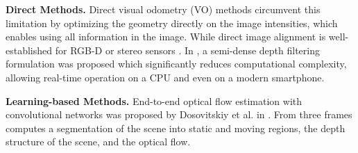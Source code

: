 \documentclass{article}
\begin{document}
\textbf{Direct Methods.} Direct visual odometry (VO) methods circumvent this limitation by optimizing the geometry directly on the image intensities, which enables using all information in the image. While direct image alignment is well-established for RGB-D or stereo sensors \cite{Kerl2014Dense} \cite{Comport2016Accurate}. In \cite{Engel2014LSD}, a semi-dense depth filtering formulation was proposed which significantly reduces computational complexity, allowing real-time operation on a CPU and even on a modern smartphone.

\textbf{Learning-based Methods.} End-to-end optical flow estimation with convolutional networks was proposed by Dosovitskiy et al. in \cite{Ilg2016FlowNet}. \cite{Wulff2017Optical} From three frames computes a segmentation of the scene into static and moving regions, the depth structure of the scene, and the optical flow.



\end{document}
